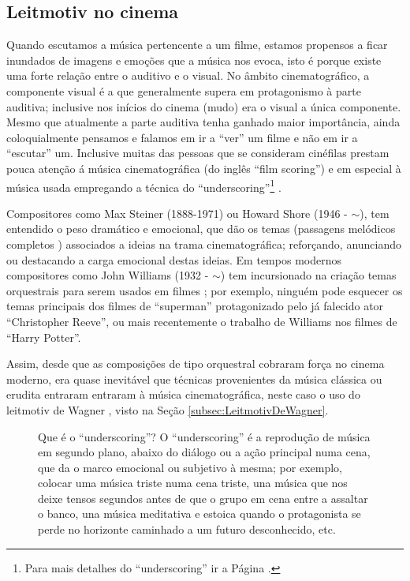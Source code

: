 \subsection{Leitmotiv no cinema}
\label{subsec:LeitmotivCine}

Quando escutamos a música pertencente a um filme, 
estamos propensos a ficar inundados de imagens e emoções que a música nos evoca,
isto é porque existe uma forte relação entre o auditivo e o visual.
No âmbito cinematográfico, a componente visual é a que generalmente supera em protagonismo à parte auditiva;
inclusive nos inícios do cinema (mudo) era o visual a única componente.
Mesmo que atualmente a parte auditiva tenha ganhado maior importância,
ainda coloquialmente pensamos e falamos em ir a ``ver'' um filme e não em ir a ``escutar'' um.
Inclusive muitas das pessoas que se consideram cinéfilas prestam pouca atenção 
á música cinematográfica (do inglês ``film scoring'') 
e em especial à música usada empregando a técnica do ``underscoring''\footnote{Para 
mais detalhes do ``underscoring'' ir a Página \pageref{page:underscoring}. } \cite[pp. 255]{bribitzer2015understanding}.

Compositores como Max Steiner (1888-1971) \cite[pp. 194]{nasta2004perspective} 
ou  Howard Shore (1946 - $\sim$), tem entendido o peso dramático e emocional,
que dão os temas (passagens melódicos completos \cite[pp. 1496]{latham2008diccionario}) associados a ideias na trama cinematográfica;
reforçando, anunciando ou destacando a carga emocional destas ideias.
Em tempos modernos compositores como John Williams (1932 - $\sim$) tem
incursionado na criação temas orquestrais para serem usados em filmes \cite[pp. 255-256]{bribitzer2015understanding};
por exemplo, ninguém pode esquecer os temas principais dos filmes de ``superman'' protagonizado pelo já falecido ator ``Christopher Reeve'',
ou mais recentemente o trabalho de Williams nos filmes de ``Harry Potter''.

Assim, desde que as composições de tipo orquestral cobraram força no cinema moderno,
era quase inevitável que  técnicas provenientes da música clássica ou erudita entraram entraram à música cinematográfica,
neste caso o uso do leitmotiv de Wagner \cite[pp. 256]{bribitzer2015understanding}, visto na Seção \ref{subsec:LeitmotivDeWagner}.



\begin{figure}[t]
\begin{elaboracion}{Que é o ``underscoring''?}
\label{ref:Underscoring}
O ``underscoring'' é a reprodução de música em segundo plano, abaixo do diálogo ou a ação principal numa cena,
que da o marco emocional ou subjetivo à mesma;
por exemplo, colocar uma música triste numa cena triste, 
una música que nos deixe tensos segundos antes de que o grupo em cena entre a assaltar o banco, 
una música meditativa e estoica quando o protagonista se perde no horizonte caminhado a um futuro desconhecido, etc.
\end{elaboracion}
\label{page:underscoring}
\end{figure}

